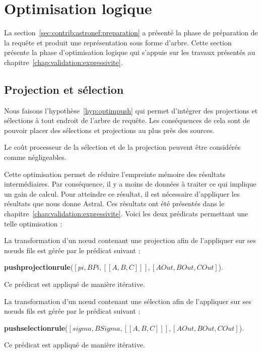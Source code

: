 \section{Optimisation logique}\label{sec:contrib:astronef:logique}
La section~\ref{sec:contrib:astronef:preparation} a présenté la phase de préparation de la requête et produit une représentation sous forme d'arbre. Cette section présente la phase d'optimisation logique qui s'appuie sur les travaux présentés au chapitre~\ref{chap:validation:expressivite}.

\subsection{Projection et sélection}
Nous faisons l'hypothèse~\ref{hyp:optimpush} qui permet d'intégrer des projections et sélections à tout endroit de l'arbre de requête. Les conséquences de cela sont de pouvoir placer des sélections et projections au plus près des sources. 
\begin{hyp}\label{hyp:optimpush}
    Le coût processeur de la sélection et de la projection peuvent être considérés comme négligeables.
\end{hyp}

Cette optimisation permet de réduire l'empreinte mémoire des résultats intermédiaires. Par conséquence, il y a moins de données à traiter ce qui implique un gain de calcul. Pour atteindre ce résultat, il est nécessaire d'appliquer les résultats que nous donne Astral. Ces résultats ont été présentés dans le chapitre~\ref{chap:validation:expressivite}. Voici les deux prédicats permettant une telle optimisation :
\begin{regle}
La transformation d'un nœud contenant une projection afin de l'appliquer sur ses nœuds fils est gérée par le prédicat suivant :
\begin{center} \textbf{pushprojectionrule}($[pi,BPi,[[A,B,C]]],[AOut,BOut,COut]$).\end{center}
Ce prédicat est appliqué de manière itérative.
\end{regle}
\begin{regle}
La transformation d'un nœud contenant une sélection afin de l'appliquer sur ses nœuds fils est gérée par le prédicat suivant :
\begin{center} \textbf{pushselectionrule}($[sigma,BSigma,[[A,B,C]]],[AOut,BOut,COut]$).\end{center}
Ce prédicat est appliqué de manière itérative.
\end{regle}

